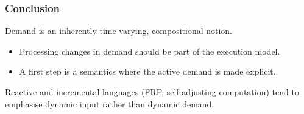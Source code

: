 \begin{frame}
\frametitle{Conclusion}
Demand is an inherently time-varying, compositional notion.
\begin{itemize}
\item Processing changes in demand should be part of the execution model.
\item A first step is a semantics where the active demand is made explicit.
\end{itemize}
\vspace{10pt}

Reactive and incremental languages (FRP, self-adjusting computation)
tend to emphasise dynamic input rather than dynamic demand.
\end{frame}
